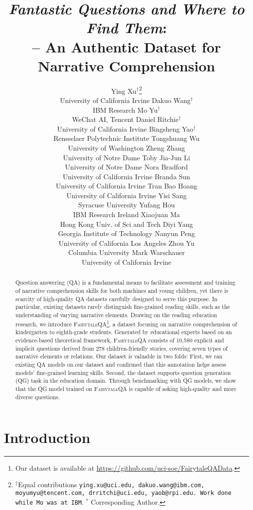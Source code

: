 \documentclass[11pt]{article}
\title{\textit{Fantastic Questions and Where to Find Them}:\\ 
\datasetname \xspace-- An Authentic Dataset for Narrative Comprehension}
\author{
Ying Xu$^{\dagger}$\thanks{$^{\dagger}$Equal contributions \texttt{ying.xu@uci.edu, dakuo.wang@ibm.com, moyumyu@tencent.com, drritchi@uci.edu, yaob@rpi.edu. Work done while Mo was at IBM}. $^*$ Corresponding Author.} \\ \small{University of California Irvine}
\And Dakuo Wang$^{\dagger}$ \\ \small{IBM Research}
\And Mo Yu$^{\dagger}$ \\ \small{WeChat AI, Tencent}
\AND Daniel Ritchie$^{\dagger}$ \\ \small{University of California Irvine}
\And Bingsheng Yao$^{\dagger}$ \\ \small{Rensselaer Polytechnic Institute}
\And Tongshuang Wu \\ \small{University of Washington}
\AND Zheng Zhang \\ \small{University of Notre Dame}
\And Toby Jia-Jun Li \\ \small{University of Notre Dame}
\And Nora Bradford \\ \small{University of California Irvine}
\AND Branda Sun \\ \small{University of California Irvine}
\And Tran Bao Hoang \\ \small{University of California Irvine}
\And Yisi Sang \\ \small{Syracuse University}
\AND Yufang Hou \\ \small{IBM Research Ireland}
\And Xiaojuan Ma \\ \small{Hong Kong Univ. of Sci and Tech}
\And Diyi Yang \\ \small{Georgia Institute of Technology}
\AND Nanyun Peng \\ \small{University of California Los Angeles}
\And Zhou Yu \\ \small{Columbia University}
\And Mark Warschauer \\ \small{University of California Irvine}
}
\newcommand{\datasetname}{\textsc{FairytaleQA}\xspace}
\begin{document}
\maketitle
\begin{abstract}
Question answering (QA) is a fundamental means to facilitate assessment and training of narrative comprehension skills for both machines and young children, yet there is scarcity of high-quality QA datasets carefully designed to serve this purpose. In particular, existing datasets rarely distinguish fine-grained reading skills, such as the understanding of varying narrative elements. 
Drawing on the reading education research, we introduce \datasetname \footnote{Our dataset is available at \url{https://github.com/uci-soe/FairytaleQAData}.}, a dataset focusing on narrative comprehension of kindergarten to eighth-grade students. Generated by educational experts based on an evidence-based theoretical framework, \datasetname consists of 10,580 explicit and implicit questions derived from 278 children-friendly stories, covering seven types of narrative elements or relations. Our dataset is valuable in two folds: First, we ran existing QA models on our dataset and confirmed that this annotation helps assess models' fine-grained learning skills. Second, the dataset supports question generation (QG) task in the education domain. Through benchmarking with QG models, we show that the QG model trained on \datasetname is capable of asking high-quality and more diverse questions. 


\end{abstract}

\newcommand{\labelstr}[1]{{ \color{clabel} \texttt{#1}}}
\section{Introduction}
\end{document}
